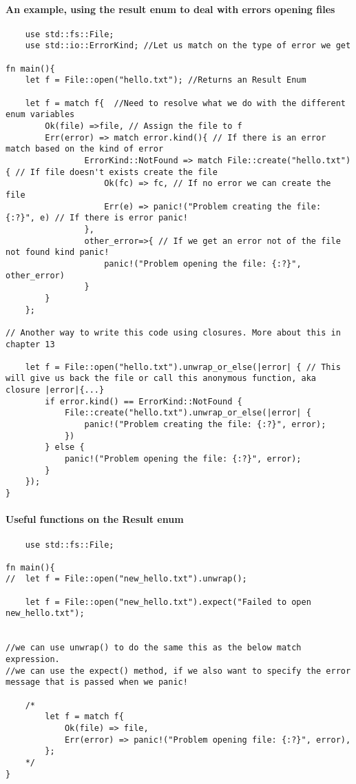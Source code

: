 \paragraph*{An example, using the result enum to deal with errors opening files}
\begin{lstlisting}
    use std::fs::File;
    use std::io::ErrorKind; //Let us match on the type of error we get

fn main(){
    let f = File::open("hello.txt"); //Returns an Result Enum

    let f = match f{  //Need to resolve what we do with the different enum variables
        Ok(file) =>file, // Assign the file to f
        Err(error) => match error.kind(){ // If there is an error match based on the kind of error
                ErrorKind::NotFound => match File::create("hello.txt"){ // If file doesn't exists create the file
                    Ok(fc) => fc, // If no error we can create the file
                    Err(e) => panic!("Problem creating the file: {:?}", e) // If there is error panic!
                },
                other_error=>{ // If we get an error not of the file not found kind panic!
                    panic!("Problem opening the file: {:?}", other_error)
                }
        }
    };

// Another way to write this code using closures. More about this in chapter 13

    let f = File::open("hello.txt").unwrap_or_else(|error| { // This will give us back the file or call this anonymous function, aka closure |error|{...}
        if error.kind() == ErrorKind::NotFound {
            File::create("hello.txt").unwrap_or_else(|error| {
                panic!("Problem creating the file: {:?}", error);
            })
        } else {
            panic!("Problem opening the file: {:?}", error);
        }
    });
}
\end{lstlisting}

\paragraph*{Useful functions on the Result enum}
\begin{lstlisting}
    use std::fs::File;

fn main(){
//  let f = File::open("new_hello.txt").unwrap(); 

    let f = File::open("new_hello.txt").expect("Failed to open new_hello.txt"); 


//we can use unwrap() to do the same this as the below match expression. 
//we can use the expect() method, if we also want to specify the error message that is passed when we panic!

    /*
        let f = match f{
            Ok(file) => file,
            Err(error) => panic!("Problem opening file: {:?}", error),
        };
    */
}
\end{lstlisting}

